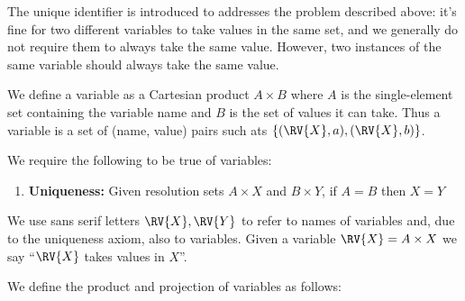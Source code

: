 The unique identifier is introduced to addresses the problem described above: it's fine for two different variables to take values in the same set, and we generally do not require them to always take the same value. However, two instances of the same variable should always take the same value.

We define a variable as a Cartesian product $A\times B$ where $A$ is the single-element set containing the variable name and $B$ is the set of values it can take. Thus a variable is a set of (name, value) pairs such ats $\{(\RV{X},a),(\RV{X},b)\}$.

We require the following to be true of variables:

\begin{enumerate}
    \item \textbf{Uniqueness:} Given resolution sets $A\times X$ and $B\times Y$, if $A=B$ then $X=Y$
\end{enumerate}

We use sans serif letters $\RV{X},\RV{Y}$ to refer to names of variables and, due to the uniqueness axiom, also to variables. Given a variable $\RV{X}=A\times X$ we say ``$\RV{X}$ takes values in $X$''.


We define the product and projection of variables as follows:
